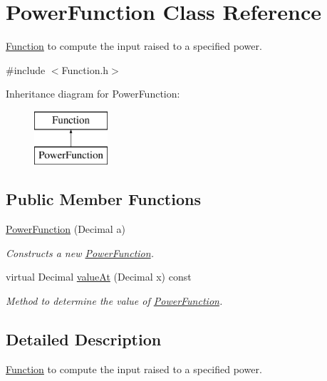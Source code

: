\hypertarget{class_power_function}{\section{Power\+Function Class Reference}
\label{class_power_function}
}


\hyperlink{class_function}{Function} to compute the input raised to a specified power.  




{\ttfamily \#include $<$Function.\+h$>$}

Inheritance diagram for Power\+Function\+:\begin{figure}[H]
\begin{center}
\leavevmode
\includegraphics[height=2.000000cm]{class_power_function}
\end{center}
\end{figure}
\subsection*{Public Member Functions}
\begin{DoxyCompactItemize}
\item 
\hyperlink{class_power_function_ae7b11ee2001d49cd47d0d5983f6742a7}{Power\+Function} (Decimal a)
\begin{DoxyCompactList}\small\item\em Constructs a new \hyperlink{class_power_function}{Power\+Function}. \end{DoxyCompactList}\item 
virtual Decimal \hyperlink{class_power_function_ad0aa1887b0434963b69a4d51fc725bcc}{value\+At} (Decimal x) const 
\begin{DoxyCompactList}\small\item\em Method to determine the value of \hyperlink{class_power_function}{Power\+Function}. \end{DoxyCompactList}\end{DoxyCompactItemize}


\subsection{Detailed Description}
\hyperlink{class_function}{Function} to compute the input raised to a specified power. 


